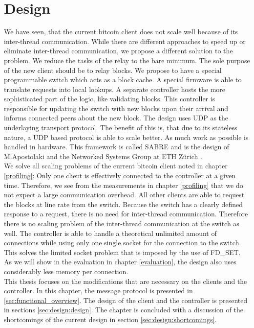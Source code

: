 \chapter{\label{design}Design}
We have seen, that the current bitcoin client does not scale well because of its inter-thread communication. While there are different approaches to speed up or eliminate inter-thread communication, we propose a different solution to the problem. We reduce the tasks of the relay to the bare minimum. The sole purpose of the new client should be to relay blocks. We propose to have a special programmable switch which acts as a block cache. A special firmware is able to translate requests into local lookups. A separate controller hosts the more sophisticated part of the logic, like validating blocks. This controller is responsible for updating the switch with new blocks upon their arrival and informs connected peers about the new block. The design uses UDP as the underlaying transport protocol. The benefit of this is, that due to its stateless nature, a UDP based protocol is able to scale better. As much work as possible is handled in hardware. This framework is called SABRE and is the design of M.Apostolaki and the Networked Systems Group at ETH Zürich \cite{apostolaki2018}.\\
We solve all scaling problems of the current bitcoin client noted in chapter \ref{profiling}: Only one client is effectively connected to the controller at a given time. Therefore, we see from the measurements in chapter \ref{profiling} that we do not expect a large communication overhead. All other clients are able to request the blocks at line rate from the switch. Because the switch has a clearly defined response to a request, there is no need for inter-thread communication. Therefore there is no scaling problem of the inter-thread communication at the switch as well. The controller is able to handle a theoretical unlimited amount of connections while using only one single socket for the connection to the switch. This solves the limited socket problem that is imposed by the use of FD\_SET. As we will show in the evaluation in chapter \ref{evaluation}, the design also uses considerably less memory per connection.\\
This thesis focuses on the modifications that are necessary on the clients and the controller. In this chapter, the message protocol is presented in \ref{sec:functional_overview}. The design of the client and the controller is presented in sections \ref{sec:design:design}. The chapter is concluded with a discussion of the shortcomings of the current design in section \ref{sec:design:shortcomings}.


